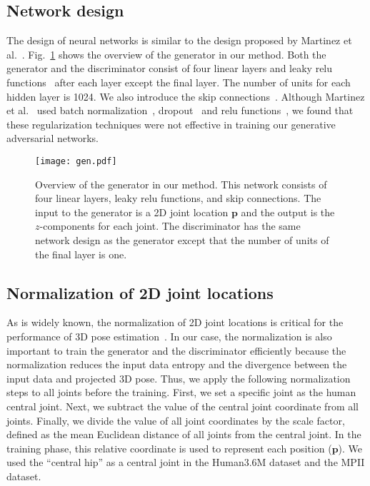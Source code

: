 \documentclass[runningheads]{llncs}
\newcommand{\Fref}[1]{Fig.~\ref{#1}}
\begin{document}
\subsection{Network design}
The design of neural networks is similar to the design proposed by Martinez et al.~\cite{martinez20173dbaseline}. \Fref{gen} shows the overview of the generator in our method.
Both the generator and the discriminator consist of four linear layers and leaky relu functions~\cite{maas2013rectifier,xu2015empirical} after each layer except the final layer.
The number of units for each hidden layer is 1024.
We also introduce the skip connections~\cite{resnet}.
Although Martinez et al.~\cite{martinez20173dbaseline} used batch normalization~\cite{batchnorm}, dropout~\cite{dropout} and relu functions~\cite{relu}, we found that these regularization techniques were not effective in training our generative adversarial networks.

\begin{figure}[tb]
  \begin{center}
    \texttt{[image: gen.pdf]}
    \caption{
Overview of the generator in our method.
This network consists of four linear layers, leaky relu functions, and skip connections.
The input to the generator is a 2D joint location ${\bm p}$ and the output is the $z$-components for each joint.
The discriminator has the same network design as the generator except that the number of units of the final layer is one.
}
    \label{gen}
  \end{center}
\end{figure}

\subsection{Normalization of 2D joint locations}
As is widely known, the normalization of 2D joint locations is critical for the performance of 3D pose estimation~\cite{martinez20173dbaseline,tome2017lifting,zhou2017towards}.
In our case, the normalization is also important to train the generator and the discriminator efficiently because the normalization reduces the input data entropy and the divergence between the input data and projected 3D pose.
Thus, we apply the following normalization steps to all joints before the training.
First, we set a specific joint as the human central joint.
Next, we subtract the value of the central joint coordinate from all joints.
Finally, we divide the value of all joint coordinates by the scale factor, defined as the mean Euclidean distance of all joints from the central joint.
In the training phase, this relative coordinate is used to represent each position (${\bm p}$).
We used the ``central hip'' as a central joint in the Human3.6M dataset and the MPII dataset.
\end{document}
